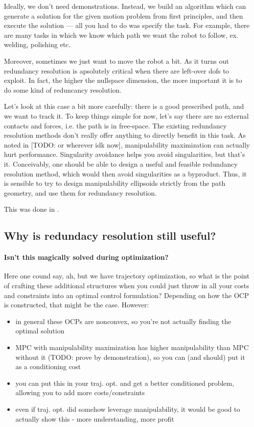 \documentclass{article}
\begin{document}
Ideally, we don't need demonstrations. Instead, we build an algorithm
which can generate a solution for the given motion problem from first 
principles, and then execute the solution --- 
all you had to do was specify the task.
For example, there are many tasks in which we know which path we want the robot 
to follow,
ex. welding, polishing etc.

Moreover, sometimes we just want to move the robot a bit.
As it turns out redundancy resolution is apsolutely critical 
when there are left-over dofs to exploit. In fact, 
the higher the nullspace dimension, the more important 
it is to do some kind of reduncancy resolution.

Let's look at this case a bit more carefully: there is a good
prescribed path, and we want to track it.
To keep things simple for now, let's say there are no 
external contacts and forces, i.e. the path is in free-space.
The existing redundancy resolution methods don't
really offer anything to directly benefit in this task.
As noted in \cite{lee1989dual} [TODO: or wherever idk now],
manipulability maximization can actually hurt performance.
Singularity avoidance helps you avoid singularities,
but that's it. Conceivably, one should be able to design
a useful and feasible redundancy resolution method,
which would then avoid singularities as a byproduct.
Thus, it is sensible to try to design manipulability ellipsoids
strictly from the path geometry, and use them for 
redundancy resolution.

This was done in \cite{yan2021decentralized}.


\subsection{Why is redundacy resolution still useful?}
\paragraph{Isn't this magically solved during optimization?}
Here one cound say, ah, but we have trajectory optimization,
so what is the point of crafting these additional structures 
when you could just throw in all your costs and constraints
into an optimal control formulation?
Depending on how the OCP is constructed, that might be the case.
However:
\begin{itemize}
\item in general these OCPs are nonconvex, so you're not actually
	finding the optimal solution
\item MPC with manipulability maximization has higher manipulability
	than MPC without it (TODO: prove by demonstration),
	so you can (and should) put it as a conditioning cost
\item you can put this in your traj. opt. and get a better
	conditioned problem, allowing you to add more costs/constraints
\item even if traj. opt. did somehow leverage manipulability,
	it would be good to actually show this - more understanding,
	more profit
\end{itemize}
\end{document}
